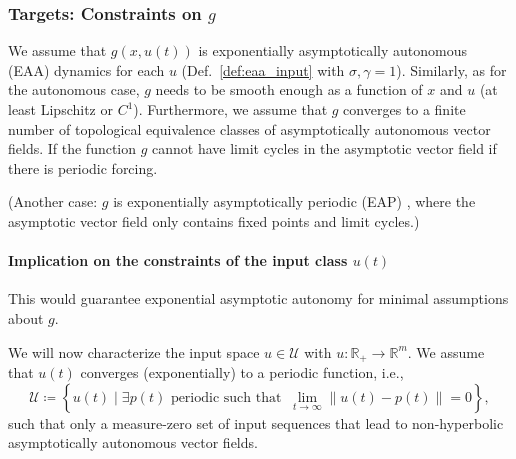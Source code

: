 \documentclass{article}
\newcommand{\ascomment}[1]{\textcolor{ascolor}{(#1)}}
\newcommand{\reals}{\mathbb{R}}
\newcounter{ct}
\begin{document}




\subsubsection{Targets: Constraints on $g$}\label{sec:input_target}



We assume that $g(x,u(t))$ is exponentially asymptotically autonomous (EAA) dynamics for each $u$ (Def.~\ref{def:eaa_input} with $\sigma,\gamma=1$). %
Similarly, as for the autonomous case, $g$ needs to be smooth enough as a function of $x$ and $u$ (at least Lipschitz or $C^1$). %
Furthermore, we assume that $g$ converges to a finite number of topological equivalence classes of asymptotically autonomous vector fields. %
If the function $g$ cannot have limit cycles  in the asymptotic vector field  if there is periodic forcing.

\ascomment{Another case: $g$ is exponentially asymptotically periodic (EAP) \label{sec:eea_input_periodic}, where the asymptotic vector field only contains  fixed points and limit cycles.}


\paragraph{Implication on the constraints of the input class $u(t)$}
This would guarantee exponential asymptotic autonomy for minimal assumptions about $g$. %

We will now characterize the input space 
$u\in \mathcal{U}$ with $u:\reals_+\rightarrow\reals^m$.
We assume that $u(t)$ converges (exponentially) to a periodic function, i.e., %
\begin{equation}
\mathcal{U} \coloneqq \left\{ u(t) \mid \exists p(t) \text{ periodic such that } \ \lim_{t \to \infty} \| u(t) - p(t) \| = 0 \right\},
\end{equation}
such that only a measure-zero set of input sequences that lead to non-hyperbolic asymptotically autonomous vector fields.
\end{document}
